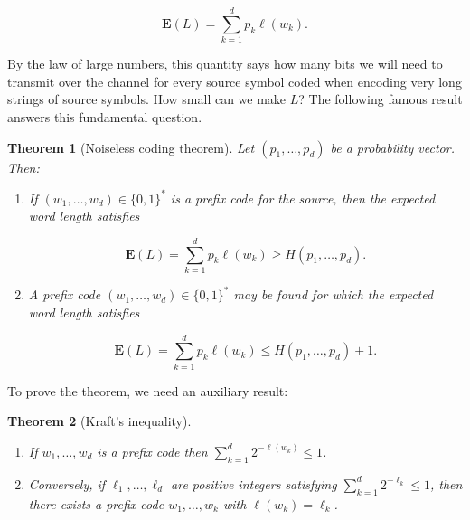 \documentclass[11pt]{report}
\theoremstyle{plain}
\newtheorem{thm}{Theorem}[chapter]
\theoremstyle{definition}
\begin{document}
\[
\mathbf{E}(L) = \sum_{k=1}^d p_k \ell(w_k).
\]

By the law of large numbers, this quantity says how many bits we will need to transmit over the channel for every source symbol coded when encoding very long strings of source symbols. How small can we make $L$? The following famous result answers this fundamental question.

\begin{thm}[Noiseless coding theorem]
Let $(p_1,\ldots,p_d)$ be a probability vector. Then:

\begin{enumerate}[label=\arabic*.]
\item If $(w_1,\ldots,w_d) \in \{0,1\}^*$ is a prefix code for the source, then the expected word length satisfies

\[
\mathbf{E}(L) = \sum_{k=1}^d p_k \ell(w_k) \ge H(p_1,\ldots, p_d).
\]
\item A prefix code $(w_1,\ldots,w_d) \in \{0,1\}^*$ may be found for which the expected word length satisfies

\[
\mathbf{E}(L) = \sum_{k=1}^d p_k \ell(w_k) \le H(p_1,\ldots, p_d) + 1.
\]
\end{enumerate}

\end{thm}

To prove the theorem, we need an auxiliary result:

\begin{thm}[Kraft's inequality]

\begin{enumerate}[label=\arabic*.]
\item If $w_1,\ldots,w_d$ is a prefix code then $\sum_{k=1}^d 2^{-\ell(w_k)} \le 1$.
\item Conversely, if $\ell_1,\ldots,\ell_d$ are positive integers satisfying $\sum_{k=1}^d 2^{-\ell_k} \le 1$, then there exists a prefix code $w_1,\ldots,w_k$ with $\ell(w_k)=\ell_k$.
\end{enumerate}

\end{thm}
\end{document}
